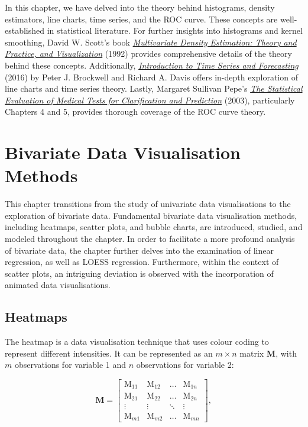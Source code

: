 \documentclass{article}\usepackage[]{graphicx}\usepackage[]{xcolor}
\numberwithin{equation}{section}
\begin{document}
\noindent In this chapter, we have delved into the theory behind histograms, density estimators, line charts, time series, and the ROC curve. These concepts are well-established in statistical literature. For further insights into histograms and kernel smoothing, David W. Scott's book \href{https://ebookcentral.proquest.com/lib/ed/detail.action?docID=1895499&pq-origsite=primo}{\textit{Multivariate Density Estimation: Theory and Practice, and Visualization}} (1992) provides comprehensive details of the theory behind these concepts. Additionally, \href{https://link-springer-com.eux.idm.oclc.org/book/10.1007/978-3-319-29854-2}{\textit{Introduction to Time Series and Forecasting}} (2016) by Peter J. Brockwell and Richard A. Davis offers in-depth exploration of line charts and time series theory. Lastly, Margaret Sullivan Pepe's \href{https://ebookcentral.proquest.com/lib/ed/detail.action?docID=1573145}{\textit{The Statistical Evaluation of Medical Tests for Clarification and Prediction}} (2003), particularly Chapters 4 and 5, provides thorough coverage of the ROC curve theory. 

\newpage

\section{Bivariate Data Visualisation Methods}

\noindent This chapter transitions from the study of univariate data visualisations to the exploration of bivariate data. Fundamental bivariate data visualisation methods, including heatmaps, scatter plots, and bubble charts, are introduced, studied, and modeled throughout the chapter. In order to facilitate a more profound analysis of bivariate data, the chapter further delves into the examination of linear regression, as well as LOESS regression. Furthermore, within the context of scatter plots, an intriguing deviation is observed with the incorporation of animated data visualisations.

\subsection{Heatmaps}
The heatmap is a data visualisation technique that uses colour coding to represent different intensities. It can be represented as an $m \times n$ matrix $\mathbf{M}$, with $m$ observations for variable 1 and $n$ observations for variable 2:

$$\mathbf{M} =
\left[
\begin{array}{cccc}
    \mathrm{M}_{11} & \mathrm{M}_{12} & \ldots & \mathrm{M}_{1n} \\  
    \mathrm{M}_{21} & \mathrm{M}_{22} & \ldots & \mathrm{M}_{2n} \\  
    \vdots & \vdots & \ddots & \vdots \\  
    \mathrm{M}_{m1} & \mathrm{M}_{m2} & \ldots & \mathrm{M}_{mn}
\end{array}
\right],
$$
\end{document}
